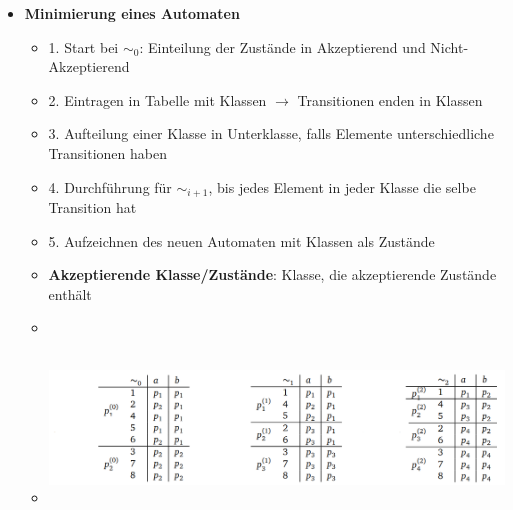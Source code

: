 \documentclass[11pt,a4paper]{article}
\begin{document}
\begin{itemize}
\begin{itemize}
	\end{itemize}
		
		
\item {\large \textbf{Minimierung eines Automaten}}
	\begin{itemize}
	\item 1. Start bei $\sim_0$: Einteilung der Zustände in Akzeptierend und Nicht-Akzeptierend
	\item 2. Eintragen in Tabelle mit Klassen $\rightarrow$ Transitionen enden in Klassen
	\item 3. Aufteilung einer Klasse in Unterklasse, falls Elemente unterschiedliche Transitionen haben
	\item 4. Durchführung für $\sim_{i+1}$, bis jedes Element in jeder Klasse die selbe Transition hat
	\item 5. Aufzeichnen des neuen Automaten mit Klassen als Zustände
	\item \textbf{Akzeptierende Klasse/Zustände}: Klasse, die akzeptierende Zustände enthält
	\item[]
	\item[]
		\begin{center}
		\includegraphics[height=4cm]{minautomatbsp}
		\end{center}
	\end{itemize}			

\pagebreak



\end{itemize}
\end{document}

